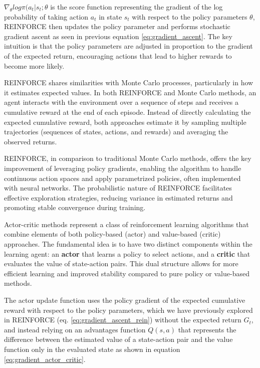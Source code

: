 $\nabla_\theta log \pi(a_t|s_t;\theta$ is the score function representing the gradient of the log probability of taking action $a_t$ in state $s_t$ with respect to the policy parameters $\theta$, REINFORCE then updates the policy parameter and performs stochastic gradient ascent as seen in previous equation \ref{eq:gradient_ascent}. The key intuition is that the policy parameters are adjusted in proportion to the gradient of the expected return, encouraging actions that lead to higher rewards to become more likely.

REINFORCE shares similarities with Monte Carlo processes, particularly in how it estimates expected values. In both REINFORCE and Monte Carlo methods, an agent interacts with the environment over a sequence of steps and receives a cumulative reward at the end of each episode. Instead of directly calculating the expected cumulative reward, both approaches estimate it by sampling multiple trajectories (sequences of states, actions, and rewards) and averaging the observed returns.

REINFORCE, in comparison to traditional Monte Carlo methods, offers the key improvement of leveraging policy gradients, enabling the algorithm to handle continuous action spaces and apply parametrized policies, often implemented with neural networks. The probabilistic nature of REINFORCE facilitates effective exploration strategies, reducing variance in estimated returns and promoting stable convergence during training.

Actor-critic methods represent a class of reinforcement learning algorithms that combine elements of both policy-based (actor) and value-based (critic) approaches. The fundamental idea is to have two distinct components within the learning agent: an \textbf{actor} that learns a policy to select actions, and a \textbf{critic} that evaluates the value of state-action pairs. This dual structure allows for more efficient learning and improved stability compared to pure policy or value-based methods.

The actor update function uses the policy gradient of the expected cumulative reward with respect to the policy parameters, which we have previously explored in REINFORCE (eq. \ref{eq:gradient_ascent_rein}) without the expected return $G_t$, and instead relying on an advantages function $Q(s,a)$ that represents the difference between the estimated value of a state-action pair and the value function only in the evaluated state as shown in equation \ref{eq:gradient_actor_critic}. 

